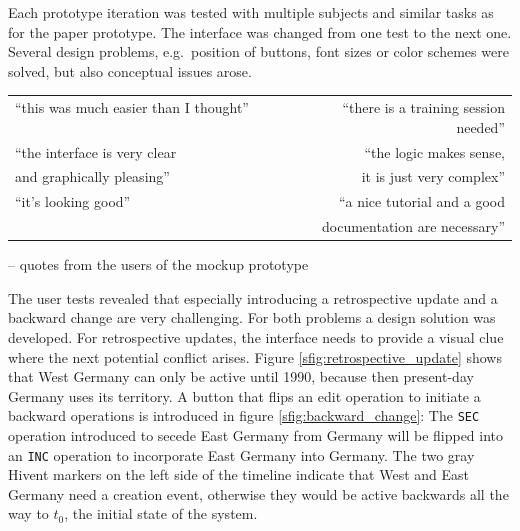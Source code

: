 Each prototype iteration was tested with multiple subjects and similar tasks as for the paper prototype. The interface was changed from one test to the next one. Several design problems, e.g.\ position of buttons, font sizes or color schemes were solved, but also conceptual issues arose.

\begin{quoteit}
  \begin{tabular}{l r}
    ``this was much easier than I thought'' ~~~~~~~~ &
    ``there is a training session needed'' \\[0.5em]
    ``the interface is very clear &
    ``the logic makes sense, \\
    and graphically pleasing'' &
    it is just very complex'' \\[0.5em]
    ``it's looking good'' &
    ``a nice tutorial and a good \\
    & documentation are necessary'' \\
  \end{tabular}
\end{quoteit}
\vspace{-1em}
\hfill -- quotes from the users of the mockup prototype

The user tests revealed that especially introducing a retrospective update and a backward change are very challenging. For both problems a design solution was developed. For retrospective updates, the interface needs to provide a visual clue where the next potential conflict arises. Figure \ref{sfig:retrospective_update} shows that West Germany can only be active until 1990, because then present-day Germany uses its territory. A button that flips an edit operation to initiate a backward operations is introduced in figure \ref{sfig:backward_change}: The \texttt{SEC} operation introduced to secede East Germany from Germany will be flipped into an \texttt{INC} operation to incorporate East Germany into Germany. The two gray Hivent markers on the left side of the timeline indicate that West and East Germany need a creation event, otherwise they would be active backwards all the way to $t_0$, the initial state of the system.

